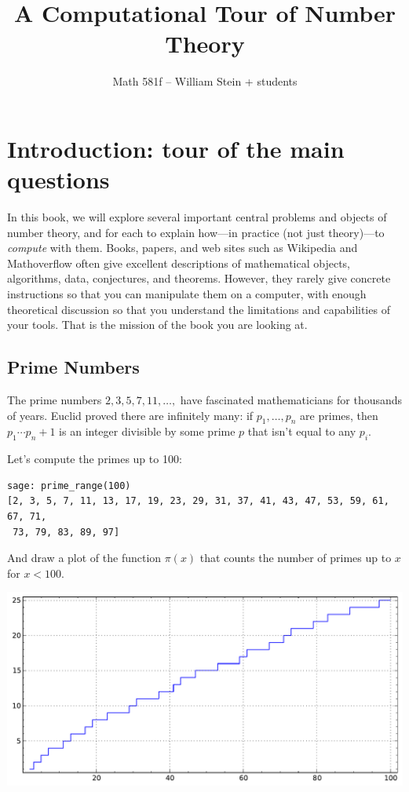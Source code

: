 \documentclass{book}
\title{A Computational Tour of Number Theory}
\author{Math 581f -- William Stein + students}
\theoremstyle{plain}
\theoremstyle{definition}
\numberwithin{equation}{section}
\numberwithin{figure}{section}
\numberwithin{table}{section}
\begin{document}
\maketitle
\tableofcontents

\chapter{Introduction: tour of the main questions}
In this book, we will explore several important central problems and
objects of number theory, and for each to explain how---in practice
(not just theory)---to {\em compute} with them.    Books,
papers, and web sites such as Wikipedia and Mathoverflow often
give excellent descriptions
of mathematical objects, algorithms, data, conjectures, and theorems.
However, they rarely give concrete instructions
so that you can manipulate them on a computer, with enough theoretical
discussion so that you understand the limitations and capabilities of
your tools.  That is the mission of the book you are looking at.


\section{Prime Numbers}
The prime numbers $2,3,5,7,11,\ldots, $ have fascinated
mathematicians for thousands of years.  Euclid proved there
are infinitely many: if $p_1,\ldots, p_n$ are primes,
then $p_1\cdots p_n + 1$ is an integer divisible by some
prime $p$ that isn't equal to any $p_i$.

Let's compute the primes up to 100:
\begin{lstlisting}
sage: prime_range(100)
[2, 3, 5, 7, 11, 13, 17, 19, 23, 29, 31, 37, 41, 43, 47, 53, 59, 61, 67, 71,
 73, 79, 83, 89, 97]
\end{lstlisting}
And draw a plot of the function $\pi(x)$ that counts the number of primes up to $x$ for $x<100$.
\begin{center}
\includegraphics[width=.7\textwidth]{pics/prime_pi-2-100.pdf}
\end{center}
\end{document}

